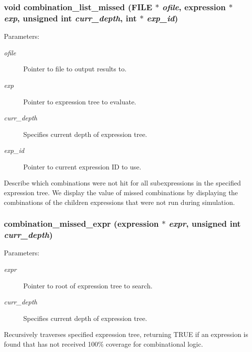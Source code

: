 \subsubsection{\setlength{\rightskip}{0pt plus 5cm}void combination\_\-list\_\-missed (FILE $\ast$ {\em ofile}, {\bf expression} $\ast$ {\em exp}, unsigned int {\em curr\_\-depth}, int $\ast$ {\em exp\_\-id})}\label{comb_8c_a16}


\begin{Desc}
\item[Parameters: ]\par
\begin{description}
\item[{\em 
ofile}]Pointer to file to output results to. \item[{\em 
exp}]Pointer to expression tree to evaluate. \item[{\em 
curr\_\-depth}]Specifies current depth of expression tree. \item[{\em 
exp\_\-id}]Pointer to current expression ID to use.\end{description}
\end{Desc}
Describe which combinations were not hit for all subexpressions in the specified expression tree. We display the value of missed combinations by displaying the combinations of the children expressions that were not run during simulation. 
\subsubsection{ combination\_\-missed\_\-expr ({\bf expression} $\ast$ {\em expr}, unsigned int {\em curr\_\-depth})}\label{comb_8c_a17}


\begin{Desc}
\item[Parameters: ]\par
\begin{description}
\item[{\em 
expr}]Pointer to root of expression tree to search. \item[{\em 
curr\_\-depth}]Specifies current depth of expression tree.\end{description}
\end{Desc}
Recursively traverses specified expression tree, returning TRUE if an expression is found that has not received 100\% coverage for combinational logic. 
